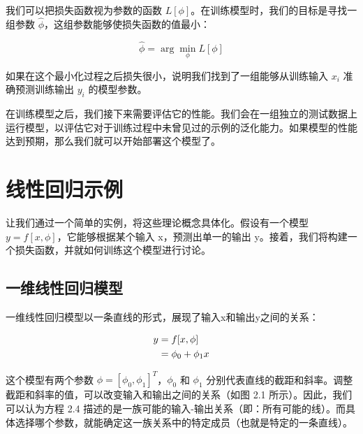 \documentclass[lang=cn,newtx,10pt,scheme=chinese]{elegantbook}
\begin{document}
我们可以把损失函数视为参数的函数 $L[\phi]$。在训练模型时，我们的目标是寻找一组参数 $\hat \phi$，这组参数能够使损失函数的值最小：

\begin{equation}
\hat \phi = \arg \mathop{\min}\limits_{\phi} L [\phi] 
\end{equation}

如果在这个最小化过程之后损失很小，说明我们找到了一组能够从训练输入 $x_i$ 准确预测训练输出 $y_i$ 的模型参数。

在训练模型之后，我们接下来需要评估它的性能。我们会在一组独立的测试数据上运行模型，以评估它对于训练过程中未曾见过的示例的泛化能力。如果模型的性能达到预期，那么我们就可以开始部署这个模型了。

\section{线性回归示例}

让我们通过一个简单的实例，将这些理论概念具体化。假设有一个模型 $y = f[x, \phi]$，它能够根据某个输入 x，预测出单一的输出 y。接着，我们将构建一个损失函数，并就如何训练这个模型进行讨论。

\subsection{一维线性回归模型}

一维线性回归模型以一条直线的形式，展现了输入x和输出y之间的关系：

\begin{align}
y &= f[x, \phi] \notag \\
&= \phi_0 + \phi_1 x 
\end{align}


这个模型有两个参数 $\phi = [\phi_0,\phi_1]^T$，$\phi_0$ 和 $\phi_1$ 分别代表直线的截距和斜率。调整截距和斜率的值，可以改变输入和输出之间的关系（如图 2.1 所示）。因此，我们可以认为方程 2.4 描述的是一族可能的输入-输出关系（即：所有可能的线）。而具体选择哪个参数，就能确定这一族关系中的特定成员（也就是特定的一条直线）。
\end{document}
